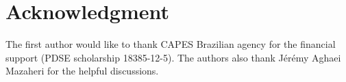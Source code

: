 \documentclass[journal]{IEEEtran}
\begin{document}


\section*{Acknowledgment}
The first author would like to thank CAPES Brazilian agency for the financial support (PDSE scholarship 18385-12-5). The authors also thank J\'er\'emy Aghaei Mazaheri for the helpful discussions.


\ifCLASSOPTIONcaptionsoff
  \newpage
\fi








%
%


\end{document}

